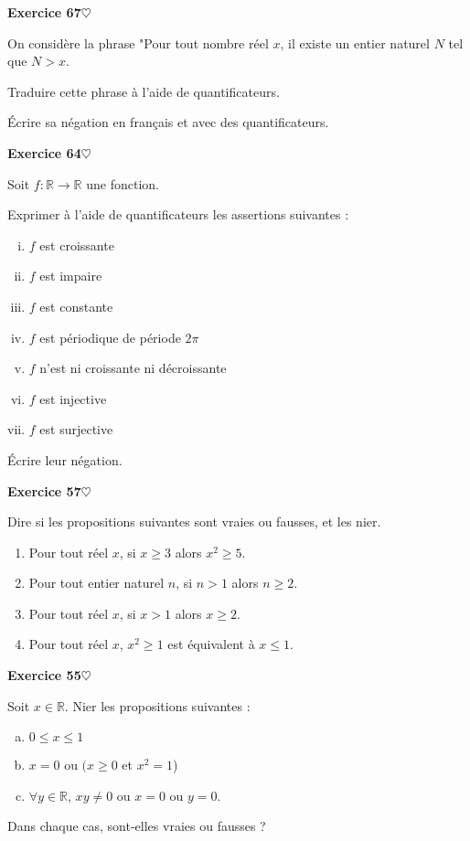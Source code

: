 ﻿\documentclass[11pt,a4paper]{amsart}
\theoremstyle{theorem}
\theoremstyle{definition}
\newcommand{\coeur}{$\heartsuit$}
\def\RR{{\mathbb R}}
\newcounter{qcounter}
\newcounter{qscounter}
\begin{document}
\everymath{\displaystyle}\textbf{Exercice 67}{\coeur}

On considère la phrase "Pour tout nombre réel $x$, il existe un entier naturel $N$ tel que $N>x$.

\question Traduire cette phrase à l'aide de quantificateurs.

\question \'Ecrire sa négation en français et avec des quantificateurs.


\setcounter{qcounter}{0} \setcounter{qscounter}{0}\textbf{Exercice 64}{\coeur}

Soit $f:\RR\to\RR$ une fonction. 

\question Exprimer à l'aide de quantificateurs les assertions suivantes :

\begin{enumerate}[(i)]
\item $f$ est croissante
\item $f$ est impaire
\item $f$ est constante
\item $f$ est périodique de période $2\pi$
\item $f$ n'est ni croissante ni décroissante
\item $f$ est injective
\item $f$ est surjective
\end{enumerate}

\question \'Ecrire leur négation.




\setcounter{qcounter}{0} \setcounter{qscounter}{0}\textbf{Exercice 57}{\coeur}

Dire si les propositions suivantes sont
vraies ou fausses, et les nier.

\begin{enumerate}
\item Pour tout réel $x$, si $x\geq 3$ alors $x^2\geq 5$.
\item Pour tout entier naturel $n$, si $n>1$ alors $n\geq 2$.
\item Pour tout réel $x$, si $x>1$ alors $x\geq 2$.
\item Pour tout réel $x$,  $x^2\geq 1$ est équivalent à $x\leq 1$.
\end{enumerate}

\setcounter{qcounter}{0} \setcounter{qscounter}{0}\textbf{Exercice 55}{\coeur}

Soit $x\in\RR$. Nier les propositions suivantes :

\begin{enumerate}[a)]
\item $0\leq x\leq 1$
\item $x=0$ ou $(x\geq 0$ et $x^2=1$)
\item $\forall y\in\RR$, $xy\neq 0$ ou $x=0$ ou $y=0$.
\end{enumerate}

Dans chaque cas, sont-elles vraies ou fausses ?

\setcounter{qcounter}{0} \setcounter{qscounter}{0}
\end{document}

